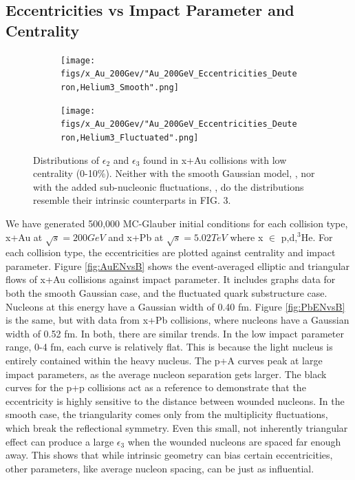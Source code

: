 \documentclass[twocolumn,showpacs,amsfonts,aps,prc,nofootinbib,floatfix]{revtex4}
\begin{document}
\subsection{Eccentricities vs Impact Parameter and Centrality}
\label{subsec:EccentricitiesVsB&Cent}
\begin{figure}
	\centering
	\begin{subfigure}[h]{0.4\linewidth}
		\centering
		\texttt{[image: figs/x\_Au\_200Gev/"Au\_200GeV\_Eccentricities\_Deuteron,Helium3\_Smooth".png]}
		\subcaption{\label{subfig:SmCentAu}}
	\end{subfigure}
	\begin{subfigure}[h]{0.4\linewidth}
		\centering
		\texttt{[image: figs/x\_Au\_200Gev/"Au\_200GeV\_Eccentricities\_Deuteron,Helium3\_Fluctuated".png]}
		\subcaption{\label{subfig:FlCentAu}}
	\end{subfigure}
	\caption{Distributions of $\epsilon_2$ and $\epsilon_3$ found in x+Au collisions with low centrality (0-10\%). Neither with the smooth Gaussian model, , nor with the added sub-nucleonic fluctuations, , do the distributions resemble their intrinsic counterparts in FIG. 3.}
	\label{fig:SmFlCentAu}
\end{figure}
We have generated 500,000 MC-Glauber initial conditions for each collision type, x+Au at $\sqrt{s} = 200GeV$ and x+Pb at $\sqrt{s} = 5.02TeV$ where x $\in$ {p,d,$^3$He}. For each collision type, the eccentricities are plotted against centrality and impact parameter. Figure \ref{fig:AuENvsB} shows the event-averaged elliptic and triangular flows of x+Au collisions against impact parameter. It includes graphs data for both the smooth Gaussian case, and the fluctuated quark substructure case. Nucleons at this energy have a Gaussian width of 0.40 fm. Figure \ref{fig:PbENvsB} is the same, but with data from x+Pb collisions, where nucleons have a Gaussian width of 0.52 fm. In both, there are similar trends. In the low impact parameter range, 0-4 fm, each curve is relatively flat. This is because the light nucleus is entirely contained within the heavy nucleus. The p+A curves peak at large impact parameters, as the average nucleon separation gets larger. The black curves for the p+p collisions act as a reference to demonstrate that the eccentricity is highly sensitive to the distance between wounded nucleons. In the smooth case, the triangularity comes only from the multiplicity fluctuations, which break the reflectional symmetry. Even this small, not inherently triangular effect can produce a large $\epsilon_3$ when the wounded nucleons are spaced far enough away. This shows that while intrinsic geometry can bias certain eccentricities, other parameters, like average nucleon spacing, can be just as influential.\\
\end{document}
